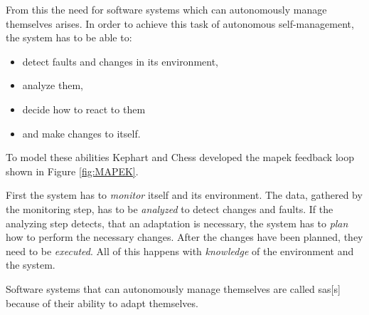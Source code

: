 \noindent From this the need for software systems which can autonomously manage themselves arises.
In order to achieve this task of autonomous self-management, the system has to be able to:
\begin{itemize}[nosep]
    \item detect faults and changes in its environment,
    \item analyze them,
    \item decide how to react to them
    \item and make changes to itself.
\end{itemize}

\noindent To model these abilities Kephart and Chess developed
the \acrfull{mapek} feedback loop \cite*{VisionOfAutonomicComputing} shown in Figure \ref{fig:MAPEK}.

\noindent First the system has to \textit{monitor} itself and its environment.
The data, gathered by the monitoring step, has to be \textit{analyzed} to detect changes and faults.
If the analyzing step detects, that an adaptation is necessary,
the system has to \textit{plan} how to perform the necessary changes.
After the changes have been planned, they need to be \textit{executed}.
All of this happens with \textit{knowledge} of the environment and the system.

\noindent Software systems that can autonomously manage themselves are called \acrfull{sas}[s]
because of their ability to adapt themselves.

